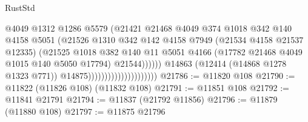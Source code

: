 \begin{lexlean}{RustStd}
\begin{coremodule}
                                                    @4049
                                                    @1312
                                                    @1286
                                                    @5579
                                                    (@21421
                                                      @21468
                                                      @4049
                                                      @374
                                                      @1018
                                                      @342
                                                      @140
                                                      @4158
                                                      @5051
                                                      (@21526
                                                        @1310
                                                        @342
                                                        @142
                                                        @4158
                                                        @7949
                                                        (@21534 @4158 @21537 @12335)
                                                        (@21525
                                                          @1018
                                                          @382
                                                          @140
                                                          @11
                                                          @5051
                                                          @4166
                                                          (@17782
                                                            @21468
                                                            @4049
                                                            @1015
                                                            @140
                                                            @5050
                                                            @17794)
                                                          @21544))))))
                                              @14863
                                              (@12414 (@14868 @1278 @1323 @771))
                                              @14875)))))))))))))))))))))
@21786 := @11820 @108
@21790 := @11822 (@11826 @108) (@11832 @108)
@21791 := @11851 @108
@21792 := @11841 @21791
@21794 := @11837 (@21792 @11856)
@21796 := @11879 (@11880 @108)
@21797 := @11875 @21796

\end{coremodule}
\end{lexlean}
